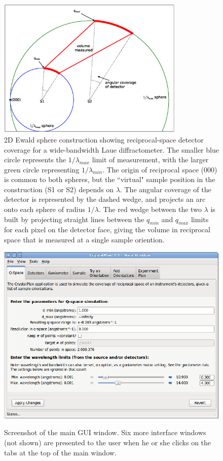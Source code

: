 \documentclass[final]{iucr}              %
\begin{document}
\begin{figure}
\caption{2D Ewald sphere construction showing reciprocal-space detector coverage
for a wide-bandwidth Laue diffractometer. The smaller blue circle represents the
$1/\lambda_{max}$ limit of measurement, with the larger green circle
representing $1/\lambda_{min}$. The origin of reciprocal space (000) is common to both
spheres, but the ``virtual" sample position in the construction (S1 or S2)
depends on $\lambda$. The angular coverage of the detector is represented by the dashed
wedge, and projects an arc onto each sphere of radius $1/\lambda$. The
red wedge between the two $\lambda$ is built by projecting straight lines between the
$q_{min}$ and $q_{max}$ limits for each pixel on the detector face, giving the
volume in reciprocal space that is measured at a single sample oriention. }

\includegraphics[width=3.5in]{ewald_fig.ps}
     
\label{fig:ewald_fig} 
\end{figure} 
 
  
\begin{figure}
\caption{Screenshot of the main GUI window. Six more interface windows (not
shown) are presented to the user when he or she clicks on the tabs at the
top of the main window.}
\includegraphics{main_gui.eps}
\label{fig:screenshots}
\end{figure}
 
\end{document}
